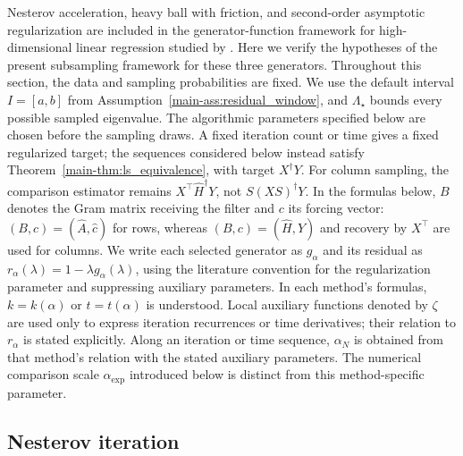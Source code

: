 \documentclass[11pt,a4paper,leqno]{article}
\numberwithin{equation}{section}
\numberwithin{figure}{section}
\numberwithin{table}{section}
\theoremstyle{plain}
\theoremstyle{definition}
\theoremstyle{remark}
\begin{document}
Nesterov acceleration, heavy ball with friction, and second-order
asymptotic regularization are included in the generator-function framework
for high-dimensional linear regression studied by
\citet{wang2025debiasing}.
Here we verify the hypotheses of the present subsampling framework
for these three generators.
Throughout this section, the data and sampling probabilities are fixed.
We use the default interval $I=[a,b]$ from
Assumption~\ref{main-ass:residual_window}, and $\Lambda_\star$ bounds every
possible sampled eigenvalue.
The algorithmic parameters specified below are chosen before the sampling
draws.  A fixed iteration count or time gives a fixed regularized target;
the sequences considered below instead satisfy
Theorem~\ref{main-thm:ls_equivalence}, with target $X^\dagger Y$.
For column sampling, the comparison estimator remains
$X^\top\widehat H^\dagger Y$, not $S(XS)^\dagger Y$.
In the formulas below, $B$ denotes the Gram matrix receiving the filter
and $c$ its forcing vector: $(B,c)=(\widehat A,\widehat c)$ for rows,
whereas $(B,c)=(\widehat H,Y)$ and recovery by $X^\top$ are used for columns.
We write each selected generator as $g_\alpha$ and its residual as $r_\alpha(\lambda)=1-\lambda g_\alpha(\lambda)$, using the literature convention for the regularization parameter and suppressing auxiliary parameters. In each method's formulas, $k=k(\alpha)$ or $t=t(\alpha)$ is understood. Local auxiliary functions denoted by $\zeta$ are used only to express iteration recurrences or time derivatives; their relation to $r_\alpha$ is stated explicitly. Along an iteration or time sequence, $\alpha_N$ is obtained from that method's relation with the stated auxiliary parameters. The numerical comparison scale $\alpha_{\mathrm{exp}}$ introduced below is distinct from this method-specific parameter.

\subsection{Nesterov iteration}
\end{document}
